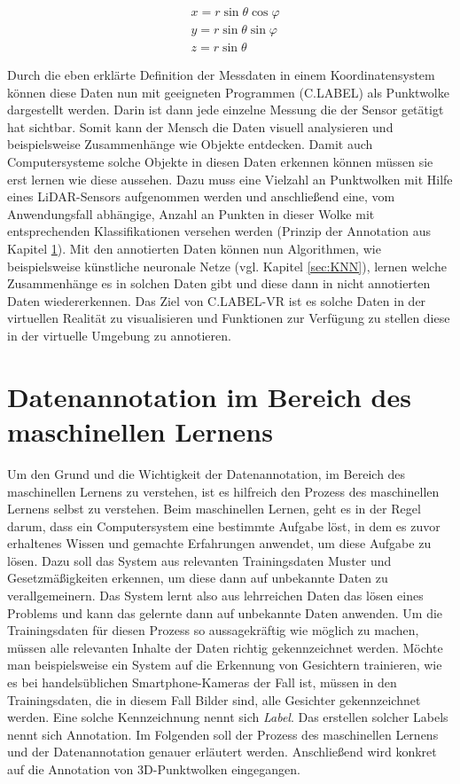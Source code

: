 \begin{subequations}
\begin{align}
        &x = r\sin\theta\cos\varphi \\
		&y = r\sin\theta\sin\varphi \\
		&z = r\sin\theta
\end{align}
\label{eq:SphToKart}
\end{subequations}

Durch die eben erklärte Definition der Messdaten in einem Koordinatensystem können diese Daten nun mit geeigneten Programmen (C.LABEL) als Punktwolke dargestellt werden. Darin ist dann jede einzelne Messung die der Sensor getätigt hat sichtbar. Somit kann der Mensch die Daten visuell analysieren und beispielsweise Zusammenhänge wie Objekte entdecken. Damit auch Computersysteme solche Objekte in diesen Daten erkennen können müssen sie erst lernen wie diese aussehen. Dazu muss eine Vielzahl an Punktwolken mit Hilfe eines LiDAR-Sensors aufgenommen werden und anschließend eine, vom Anwendungsfall abhängige, Anzahl an Punkten in dieser Wolke mit entsprechenden Klassifikationen versehen werden (Prinzip der Annotation aus Kapitel \ref{sec:Annotation}). Mit den annotierten Daten können nun Algorithmen, wie beispielsweise künstliche neuronale Netze (vgl. Kapitel \ref{sec:KNN}), lernen welche Zusammenhänge es in solchen Daten gibt und diese dann in nicht annotierten Daten wiedererkennen. Das Ziel von C.LABEL-VR ist es solche Daten in der virtuellen Realität zu visualisieren und Funktionen zur Verfügung zu stellen diese in der virtuelle Umgebung zu annotieren.

\section{Datenannotation im Bereich des maschinellen Lernens}
\label{sec:Annotation}

Um den Grund und die Wichtigkeit der Datenannotation, im Bereich des maschinellen Lernens zu verstehen, ist es hilfreich den Prozess des maschinellen Lernens selbst zu verstehen. Beim maschinellen Lernen, geht es in der Regel darum, dass ein Computersystem eine bestimmte Aufgabe löst, in dem es zuvor erhaltenes Wissen und gemachte Erfahrungen anwendet, um diese Aufgabe zu lösen. Dazu soll das System aus relevanten Trainingsdaten Muster und Gesetzmäßigkeiten erkennen, um diese dann auf unbekannte Daten zu verallgemeinern. Das System lernt also aus lehrreichen Daten das lösen eines Problems und kann das gelernte dann auf unbekannte Daten anwenden. Um die Trainingsdaten für diesen Prozess so aussagekräftig wie möglich zu machen, müssen alle relevanten Inhalte der Daten richtig gekennzeichnet werden. Möchte man beispielsweise ein System auf die Erkennung von Gesichtern trainieren, wie es bei handelsüblichen Smartphone-Kameras der Fall ist, müssen in den Trainingsdaten, die in diesem Fall Bilder sind, alle Gesichter gekennzeichnet werden. Eine solche Kennzeichnung nennt sich \textit{Label}. Das erstellen solcher Labels nennt sich Annotation. Im Folgenden soll der Prozess des maschinellen Lernens und der Datenannotation genauer erläutert werden. Anschließend wird konkret auf die Annotation von 3D-Punktwolken eingegangen.

